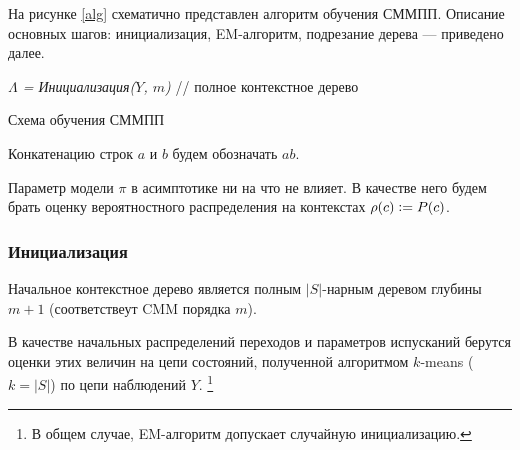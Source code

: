 \documentclass{matmex-diploma-custom}
\begin{document}
На рисунке \ref{alg} схематично представлен алгоритм обучения СММПП. Описание основных шагов: инициализация, EM-алгоритм, подрезание дерева --- приведено далее.
\\

\begin{algorithm}[H]
 \textit{
 $\Lambda$ = Инициализация($Y$, $m$)
 }\;
 // полное контекстное дерево\\
 \caption{Схема обучения СММПП}
 \label{alg}
\end{algorithm}

Конкатенацию строк $a$ и $b$ будем обозначать $ab$.

Параметр модели $\pi$ в асимптотике ни на что не влияет. В качестве него будем брать оценку вероятностного распределения на контекстах $\rho(c) \mathrel{\mathop:}= P(c)$.

\subsubsection{Инициализация}
Начальное контекстное дерево является полным $|S|$-нарным деревом глубины $m+1$ (соответствеут CMM порядка $m$).

В качестве начальных распределений переходов и параметров испусканий берутся оценки этих величин на цепи состояний, полученной алгоритмом $k$-means ($k=|S|$) по цепи наблюдений $Y$. \footnote{В общем случае, EM-алгоритм допускает случайную инициализацию.}
\end{document}
